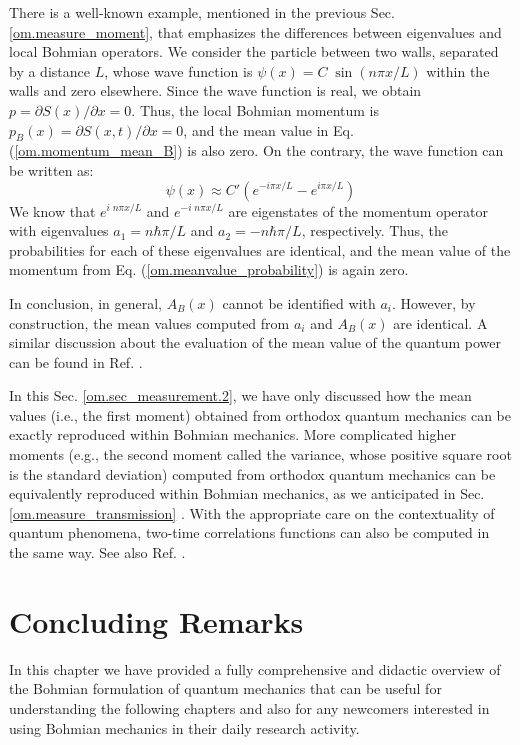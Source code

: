 \documentclass[nofootinbib, secnumarabic, amsmath, nobibnotes,10pt,aps,pra]{revtex4-1}
\newcommand{\sref}[1]{Sec. \ref{#1}}
\newcommand{\eref}[1]{Eq. (\ref{#1})}
\begin{document}
There is a well-known example, mentioned in the previous
\sref{om.measure_moment}, that emphasizes the differences between
eigenvalues and local Bohmian operators. We consider the particle
between two walls, separated by a distance $L$, whose wave function
is $\psi(x) = C \; \sin(n\pi x/L)$ within the walls and zero
elsewhere. Since the wave function is real, we obtain $p = \partial
S(x)/\partial x = 0$. Thus, the local Bohmian momentum is $p_B(x) =
{\partial S(x,t)}/{\partial x} = 0$, and the mean value in
\eref{om.momentum_mean_B} is also zero. On the contrary, the wave
function can be written as:
\begin{equation}
\psi(x) \approx C' \left(e^{-i\pi x/L}-e^{i\pi x/L} \right)
\end{equation}
We know that $e^{i \; n \pi x/L}$ and $e^{-i \; n \pi x/L}$ are
eigenstates of the momentum operator with eigenvalues $a_1 = n \hbar
\pi/L$ and $a_2 = -n \hbar \pi/L$, respectively. Thus, the
probabilities for each of these eigenvalues are identical, and the
mean value of the momentum from \eref{om.meanvalue_probability} is
again zero.

In conclusion, in general, $A_B(x)$ cannot be identified with $a_i$.
However, by construction, the mean values computed from $a_i$ and
$A_B(x)$ are identical. A similar discussion about the evaluation of
the mean value of the  quantum power can be found in Ref.
\cite{om.quantumpower}.

In this \sref{om.sec_measurement.2}, we have only discussed how the
mean values (i.e., the first moment) obtained from orthodox quantum
mechanics can be exactly reproduced within Bohmian mechanics. More
complicated higher moments (e.g., the second moment called the
variance, whose positive square root is the standard deviation)
computed from orthodox quantum mechanics can be equivalently
reproduced within Bohmian mechanics, as we anticipated in
\sref{om.measure_transmission} \cite{om.Durrnaive,om.Durrllibre,
om.goldstein}. With the appropriate care on the contextuality of quantum phenomena,  two-time correlations functions can also be computed in the same way. See also Ref. \cite{om.Muga}.


\section{Concluding Remarks}

In this chapter we have provided a fully comprehensive and didactic overview of the Bohmian formulation of quantum mechanics that can be useful for understanding the following chapters and also for any newcomers interested in using Bohmian mechanics in their daily research activity.
\end{document}
